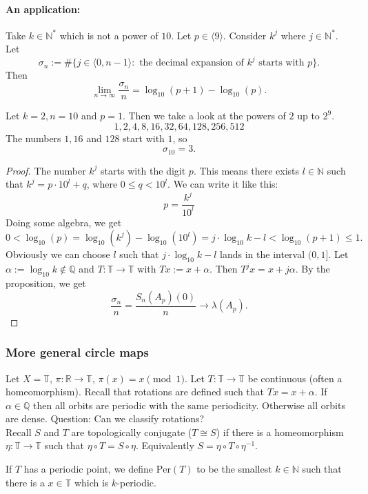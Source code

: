 \documentclass{article}
\newcommand*{\N}{\mathbb{N}}
\newcommand*{\Q}{\mathbb{Q}}
\newcommand*{\R}{\mathbb{R}}
\newcommand*{\T}{\mathbb{T}}
\newcommand*{\Ns}{\N^*}
\newcommand*{\jbr}[1]{{\langle #1 \rangle}}
\newcommand*{\limn}{\lim_{n\to\infty}}
\newcommand*{\Per}{\text{Per}}
\begin{document}
\paragraph{An application:}
Take $k\in\Ns$ which is not a power of $10$. Let $p\in\jbr{9}$. Consider $k^j$ where $j\in\Ns$. Let
$$\sigma_n:=\#\{j\in\jbr{0,n-1}: \text{ the decimal expansion of } k^j \text{ starts with } p\}.$$
Then
$$\limn\frac{\sigma_n}n =\log_{10}(p+1)-\log_{10}(p).$$

\begin{exam}
    Let $k=2, n=10$ and $p = 1$. Then we take a look at the powers of $2$ up to $2^9$.
    $$1,2,4,8,16,32,64,128,256,512$$
    The numbers $1,16$ and $128$ start with $1$, so
    $$\sigma_{10}=3.$$
\end{exam}

\begin{proof}
    The number $k^j$ starts with the digit $p$. This means there exists $l\in\N$ such that $k^j=p\cdot10^l+q$, where $0\leq q < 10^l$. We can write it like this:
    $$p = \frac{k^j}{10^l}$$
    Doing some algebra, we get
    $$0<\log_{10}(p)=\log_{10}(k^j)-\log_{10}(10^l)= j\cdot\log_{10}k-l<\log_{10}(p+1)\leq1.$$
    Obviously we can choose $l$ such that $j\cdot\log_{10}k-l$ lands in the interval $(0,1]$. Let $\alpha:=\log_{10}k\notin\Q$ and $T:\T\to\T$ with $Tx:=x+\alpha$. Then $T^jx=x+j\alpha$. By the proposition, we get
    $$\frac{\sigma_n}{n}=\frac{S_n(A_p)(0)}{n}\to \lambda(A_p).$$
\end{proof}

\subsubsection{More general circle maps}

Let $X = \T$, $\pi:\R\to \T$, $\pi(x) = x \pmod 1$. Let $T:\T\to\T$ be continuous (often a homeomorphism). Recall that rotations are defined such that $Tx = x+\alpha$. If $\alpha \in \Q$ then all orbits are periodic with the same periodicity. Otherwise all orbits are dense.
\newline
\newline
Question: Can we classify rotations?\\
Recall $S$ and $T$ are topologically conjugate ($T\cong S$) if there is a homeomorphism $\eta:\T\to\T$ such that $\eta\circ T=S\circ \eta$. Equivalently $S = \eta \circ T\circ \eta^{-1}$.

\begin{defin}
    If $T$ has a periodic point, we define $\Per(T)$ to be the smallest $k\in\N$ such that there is a $x\in \T$ which is $k$-periodic.
\end{defin}
\end{document}
